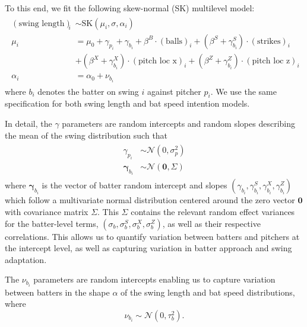 \documentclass{article}
\begin{document}
    To this end, we fit the following skew-normal (SK) multilevel model:
    \begin{align}
    \label{eqn:intention-swing-length}
    \begin{split}
        ( \mbox{swing length} )_i &\sim \mbox{SK}(\mu_i, \sigma, \alpha_i) \\
        \mu_i &= \mu_0 + \gamma_{p_i} + \gamma_{b_i}
        + \beta^B \cdot (\mbox{balls})_i
          + (\beta^S + \gamma^S_{b_i}) \cdot (\mbox{strikes})_i\\
        & + (\beta^X + \gamma^X_{b_i}) \cdot (\mbox{pitch loc x})_i
          + (\beta^Z + \gamma^Z_{b_i}) \cdot (\mbox{pitch loc z})_i \\
          \alpha_i &= \alpha_0 + \nu_{b_i}
    \end{split}
    \end{align}
    where $b_i$ denotes the batter on swing $i$ against pitcher $p_i$. We use the same specification for both swing length and bat speed intention models. 
    
    In detail, the $\gamma$ parameters are random intercepts and random slopes describing the mean of the swing distribution such that
    \begin{align}
        \begin{split}
            \gamma_{p_i} &\sim \mathcal{N}(0, \sigma^2_p) \\
            \boldsymbol{\gamma}_{b_i} &\sim \mathcal{N}(\boldsymbol{0}, \Sigma)
        \end{split}
    \end{align}
    where $\boldsymbol{\gamma}_{b_i}$ is the vector of batter random intercept and slopes $(\gamma_{b_i}, \gamma^S_{b_i}, \gamma^X_{b_i}, \gamma^Z_{b_i})$ which follow a multivariate normal distribution centered around the zero vector $\boldsymbol{0}$ with covariance matrix $\Sigma$. This $\Sigma$ contains the relevant random effect variances for the batter-level terms, $(\sigma_b, \sigma_b^S, \sigma_b^X, \sigma_b^Z)$, as well as their respective correlations. This allows us to quantify variation between batters and pitchers at the intercept level, as well as capturing variation in batter approach and swing adaptation.
    
    The $\nu_{b_i}$ parameters are random intercepts enabling us to capture variation between batters in the shape $\alpha$ of the swing length and bat speed distributions, where
    \begin{equation}
        \nu_{b_i} \sim \mathcal{N}(0, \tau^2_b).
    \end{equation}
\end{document}
